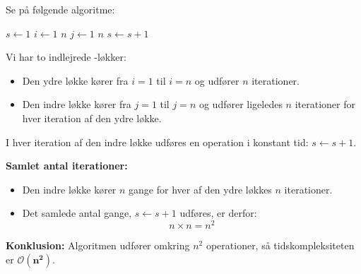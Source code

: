  \begin{example}

    Se på følgende algoritme:
    
    \begin{codebox}
        \li $s \gets 1$
        \li \For $i \gets 1$ \To $n$ \Do
        \li     \For $j \gets 1$ \To $n$ \Do
        \li         $s \gets s + 1$
                \End
            \End
    \end{codebox}
    
    
    Vi har to indlejrede \texttt{\For}-løkker:
    
    \begin{itemize}
        \item Den ydre løkke kører fra $i = 1$ til $i = n$ og udfører $n$ iterationer.
        \item Den indre løkke kører fra $j = 1$ til $j = n$ og udfører ligeledes $n$ iterationer for hver iteration af den ydre løkke.
    \end{itemize}
    
    I hver iteration af den indre løkke udføres en operation i konstant tid: $s \gets s + 1$.
    
    \textbf{Samlet antal iterationer:}
    
    \begin{itemize}
        \item Den indre løkke kører $n$ gange for hver af den ydre løkkes $n$ iterationer.
        \item Det samlede antal gange, $s \gets s + 1$ udføres, er derfor:
        \[ n \times n = n^2 \]
    \end{itemize}
    
    \textbf{Konklusion:} Algoritmen udfører omkring $n^2$ operationer, så tidskompleksiteten er $\boldsymbol{\mathcal{O}(n^2)}$.
        
\end{example}


